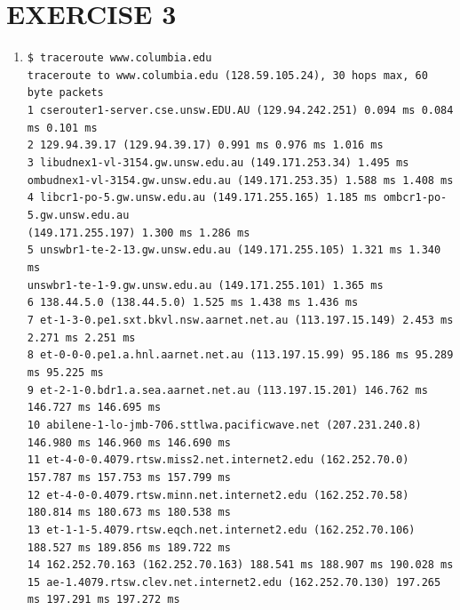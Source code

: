 \documentclass[a4paper,11pt]{article}
\newcommand{\code}{\texttt}
\begin{document}
\section{EXERCISE 3}
\begin{enumerate}[leftmargin=*]
	\item \code{\footnotesize \$ traceroute www.columbia.edu\\
			traceroute to www.columbia.edu (128.59.105.24), 30 hops max, 60 byte packets\\
		 1  cserouter1-server.cse.unsw.EDU.AU (129.94.242.251)  0.094 ms  0.084 ms  0.101 ms\\
		 2  129.94.39.17 (129.94.39.17)  0.991 ms  0.976 ms  1.016 ms\\
		 3  libudnex1-vl-3154.gw.unsw.edu.au (149.171.253.34)  1.495 ms\\
		 	ombudnex1-vl-3154.gw.unsw.edu.au (149.171.253.35)  1.588 ms  1.408 ms\\
		 4  libcr1-po-5.gw.unsw.edu.au (149.171.255.165)  1.185 ms ombcr1-po-5.gw.unsw.edu.au\\
		 (149.171.255.197)  1.300 ms  1.286 ms\\
		 5  unswbr1-te-2-13.gw.unsw.edu.au (149.171.255.105)  1.321 ms  1.340 ms\\
		 	unswbr1-te-1-9.gw.unsw.edu.au (149.171.255.101)  1.365 ms\\
		 6  138.44.5.0 (138.44.5.0)  1.525 ms  1.438 ms  1.436 ms\\
		 7  et-1-3-0.pe1.sxt.bkvl.nsw.aarnet.net.au (113.197.15.149)  2.453 ms  2.271 ms  2.251 ms\\
		 8  et-0-0-0.pe1.a.hnl.aarnet.net.au (113.197.15.99)  95.186 ms  95.289 ms  95.225 ms\\
		 9  et-2-1-0.bdr1.a.sea.aarnet.net.au (113.197.15.201)  146.762 ms  146.727 ms  146.695 ms\\
		10  abilene-1-lo-jmb-706.sttlwa.pacificwave.net (207.231.240.8)  146.980 ms  146.960 ms  146.690 ms\\
		11  et-4-0-0.4079.rtsw.miss2.net.internet2.edu (162.252.70.0)  157.787 ms  157.753 ms  157.799 ms\\
		12  et-4-0-0.4079.rtsw.minn.net.internet2.edu (162.252.70.58)  180.814 ms  180.673 ms  180.538 ms\\
		13  et-1-1-5.4079.rtsw.eqch.net.internet2.edu (162.252.70.106)  188.527 ms  189.856 ms  189.722 ms\\
		14  162.252.70.163 (162.252.70.163)  188.541 ms  188.907 ms  190.028 ms\\
		15  ae-1.4079.rtsw.clev.net.internet2.edu (162.252.70.130)  197.265 ms  197.291 ms  197.272 ms\\
}
\end{enumerate}
\end{document}
